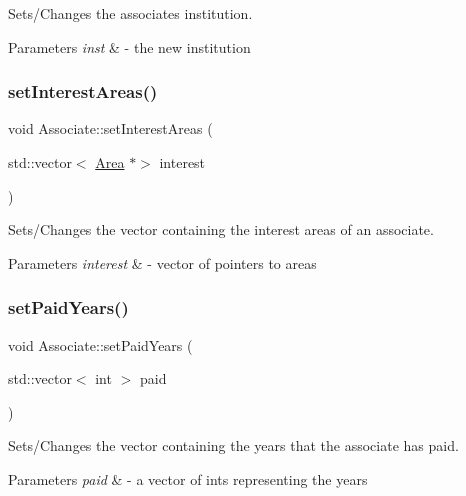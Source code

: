 Sets/\+Changes the associate\textquotesingle{}s institution. 


\begin{DoxyParams}{Parameters}
{\em inst} & -\/ the new institution \\
\hline
\end{DoxyParams}
\mbox{\label{classAssociate_a5b416da0898fd5dda854eb0027e9e8a1}} 
\subsubsection{\texorpdfstring{set\+Interest\+Areas()}{setInterestAreas()}}
{\footnotesize\ttfamily void Associate\+::set\+Interest\+Areas (\begin{DoxyParamCaption}\item[{std\+::vector$<$ \hyperlink{classArea}{Area} $\ast$$>$}]{interest }\end{DoxyParamCaption})}



Sets/\+Changes the vector containing the interest areas of an associate. 


\begin{DoxyParams}{Parameters}
{\em interest} & -\/ vector of pointers to areas \\
\hline
\end{DoxyParams}
\mbox{\label{classAssociate_a474ef6683f939d3ccec7bbbf1bd03f96}} 
\subsubsection{\texorpdfstring{set\+Paid\+Years()}{setPaidYears()}}
{\footnotesize\ttfamily void Associate\+::set\+Paid\+Years (\begin{DoxyParamCaption}\item[{std\+::vector$<$ int $>$}]{paid }\end{DoxyParamCaption})}



Sets/\+Changes the vector containing the years that the associate has paid. 


\begin{DoxyParams}{Parameters}
{\em paid} & -\/ a vector of ints representing the years \\
\hline
\end{DoxyParams}
\mbox{\label{classAssociate_a575f0c9367cb22a88737952430fe6a48}} 
